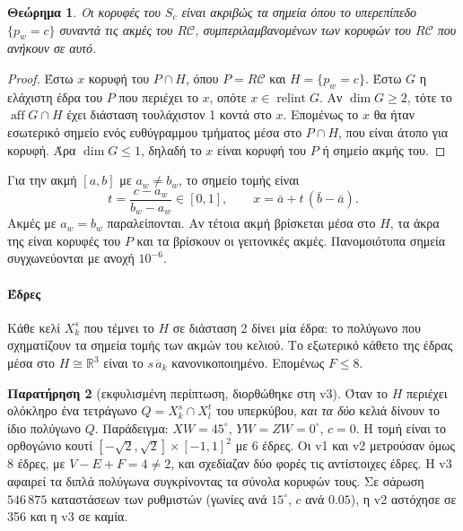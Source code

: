 \documentclass[10pt,a4paper]{article}
\theoremstyle{plain}
\newtheorem{theorem}{Θεώρημα}
\theoremstyle{definition}
\newtheorem{remark}[theorem]{Παρατήρηση}
\newcommand{\R}{\mathbb{R}}
\newcommand{\C}{\mathcal{C}}
\DeclareMathOperator{\relint}{relint}
\DeclareMathOperator{\aff}{aff}
\begin{document}
\begin{theorem}\label{thm:slicevert}
Οι κορυφές του $S_c$ είναι ακριβώς τα σημεία όπου το υπερεπίπεδο $\{p_w=c\}$ συναντά τις ακμές του $R\C$, συμπεριλαμβανομένων των κορυφών του $R\C$ που ανήκουν σε αυτό.
\end{theorem}
\begin{proof}
Έστω $x$ κορυφή του $P\cap H$, όπου $P=R\C$ και $H=\{p_w=c\}$. Έστω $G$ η ελάχιστη έδρα του $P$ που περιέχει το $x$, οπότε $x\in\relint G$. Αν $\dim G\ge2$, τότε το $\aff G\cap H$ έχει διάσταση τουλάχιστον 1 κοντά στο $x$. Επομένως το $x$ θα ήταν εσωτερικό σημείο ενός ευθύγραμμου τμήματος μέσα στο $P\cap H$, που είναι άτοπο για κορυφή. Άρα $\dim G\le1$, δηλαδή το $x$ είναι κορυφή του $P$ ή σημείο ακμής του.
\end{proof}
Για την ακμή $[a,b]$ με $a_w\neq b_w$, το σημείο τομής είναι
\[
t=\frac{c-a_w}{b_w-a_w}\in[0,1],\qquad x=\bar a+t\,(\bar b-\bar a).
\]
Ακμές με $a_w=b_w$ παραλείπονται. Αν τέτοια ακμή βρίσκεται μέσα στο $H$, τα άκρα της είναι κορυφές του $P$ και τα βρίσκουν οι γειτονικές ακμές. Πανομοιότυπα σημεία συγχωνεύονται με ανοχή $10^{-6}$.

\paragraph{Έδρες} Κάθε κελί $X_k^s$ που τέμνει το $H$ σε διάσταση 2 δίνει μία έδρα: το πολύγωνο που σχηματίζουν τα σημεία τομής των ακμών του κελιού. Το εξωτερικό κάθετο της έδρας μέσα στο $H\cong\R^3$ είναι το $\overline{s\,a_k}$ κανονικοποιημένο. Επομένως $F\le8$.

\begin{remark}[εκφυλισμένη περίπτωση, διορθώθηκε στη v3]
Όταν το $H$ περιέχει ολόκληρο ένα τετράγωνο $Q=X_k^s\cap X_l^t$ του υπερκύβου, \emph{και τα δύο} κελιά δίνουν το ίδιο πολύγωνο $Q$. Παράδειγμα: $XW=45^\circ$, $YW=ZW=0^\circ$, $c=0$. Η τομή είναι το ορθογώνιο κουτί $[-\sqrt2,\sqrt2]\times[-1,1]^2$ με 6 έδρες. Οι v1 και v2 μετρούσαν όμως 8 έδρες, με $V-E+F=4\neq2$, και σχεδίαζαν δύο φορές τις αντίστοιχες έδρες. Η v3 αφαιρεί τα διπλά πολύγωνα συγκρίνοντας τα σύνολα κορυφών τους. Σε σάρωση $546\,875$ καταστάσεων των ρυθμιστών (γωνίες ανά $15^\circ$, $c$ ανά $0.05$), η v2 αστόχησε σε 356 και η v3 σε καμία.
\end{remark}
\end{document}
